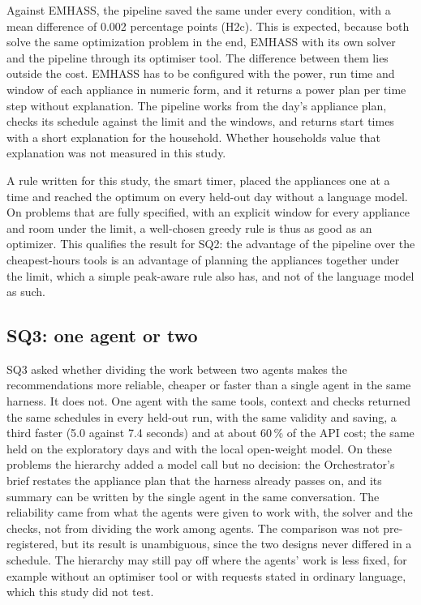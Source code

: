 \documentclass[12pt,a4paper]{report}
\begin{document}
Against EMHASS, the pipeline saved the same under every condition, with
a mean difference of 0.002 percentage points (H2c). This is expected,
because both solve the same optimization problem in the end, EMHASS with
its own solver and the pipeline through its optimiser tool. The
difference between them lies outside the cost. EMHASS has to be
configured with the power, run time and window of each appliance in
numeric form, and it returns a power plan per time step without
explanation. The pipeline works from the day's appliance plan, checks
its schedule against the limit and the windows, and returns start times
with a short explanation for the household. Whether households value
that explanation was not measured in this study.

A rule written for this study, the smart timer, placed the appliances
one at a time and reached the optimum on every held-out day without a
language model. On problems that are fully specified, with an explicit
window for every appliance and room under the limit, a well-chosen
greedy rule is thus as good as an optimizer. This qualifies the result
for SQ2: the advantage of the pipeline over the cheapest-hours tools is
an advantage of planning the appliances together under the limit, which
a simple peak-aware rule also has, and not of the language model as
such.

\subsection{SQ3: one agent or two}

SQ3 asked whether dividing the work between two agents makes the
recommendations more reliable, cheaper or faster than a single agent in
the same harness. It does not. One agent with the same tools, context
and checks returned the same schedules in every held-out run, with the
same validity and saving, a third faster (5.0 against 7.4 seconds) and
at about 60\,\% of the API cost; the same held on the exploratory days
and with the local open-weight model. On these problems the hierarchy
added a model call but no decision: the Orchestrator's brief restates the
appliance plan that the harness already passes on, and its summary can
be written by the single agent in the same conversation. The reliability
came from what the agents were given to work with, the solver and the
checks, not from dividing the work among agents. The comparison was not
pre-registered, but its result is unambiguous, since the two designs
never differed in a schedule. The hierarchy may still pay off where the
agents' work is less fixed, for example without an optimiser tool or with
requests stated in ordinary language, which this study did not test.
\end{document}
